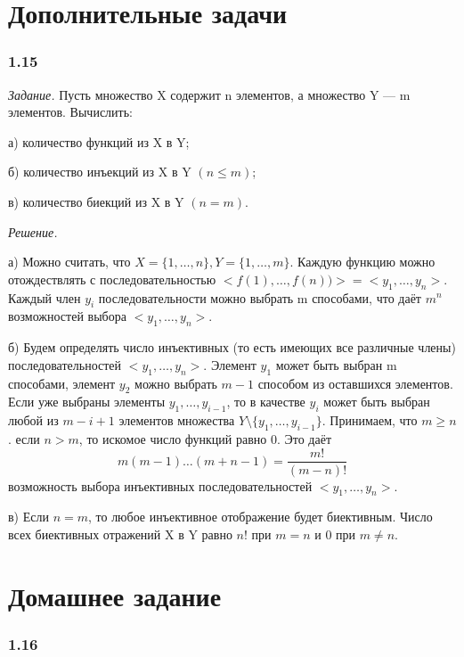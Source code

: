 \documentclass{book}
\begin{document}
\section*{Дополнительные задачи}

\subsubsection*{1.15}

\textit{Задание.} Пусть множество X содержит n элементов, а множество Y --- m элементов.
Вычислить:

а) количество функций из X в Y;

б) количество инъекций из X в Y $\left(n\leq m\right)$;

в) количество биекций из X в Y $\left(n=m\right)$.

\textit{Решение.}

а) Можно считать, что $ X = \{1,  \dotsc , n \}, Y = \{1,  \dotsc , m \}$.
Каждую функцию можно отождествлять с последовательностью $ < f(1),  \dotsc , f(n) ) > = < y_1,  \dotsc , y_n > $.
Каждый член $y_i$ последовательности можно выбрать m способами, что даёт $m^n$ возможностей выбора $ < y_1,  \dotsc , y_n > $.

б) Будем определять число инъективных (то есть имеющих все различные члены) последовательностей $ < y_1,  \dotsc , y_n > $.
Элемент $y_1$ может быть выбран m способами, элемент $y_2$ можно выбрать $m-1$ способом из оставшихся элементов.
Если уже выбраны элементы $ y_1,  \dotsc , y_{i-1} $,
то в качестве $y_i$ может быть выбран любой из $m-i+1$ элементов множества
$Y\setminus\{y_1,  \dotsc , y_{i-1}\}$. Принимаем, что $ m \geq n $. если $ n > m $,
то искомое число функций равно 0.
Это даёт
$$m\left(m-1\right) \dotsc (m+n-1)
=\frac{m!}{\left(m-n\right)!}$$
возможность выбора инъективных последовательностей $<y_1,  \dotsc , y_n>$.

в) Если $n=m$, то любое инъективное отображение будет биективным.
Число всех биективных отражений X в Y равно $n!$ при $m = n$ и 0 при $m \neq n$.

\section*{Домашнее задание}

\subsubsection*{1.16}
\end{document}
